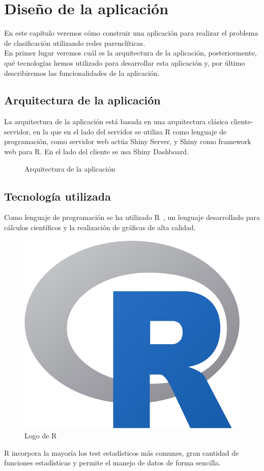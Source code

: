 \chapter{Diseño de la aplicación}

En este capítulo veremos cómo construir una aplicación para realizar el problema de clasificación utilizando redes parenclíticas.\\

En primer lugar veremos cuál es la arquitectura de la aplicación, posteriormente, qué tecnologías hemos utilizado para desarrollar esta aplicación y, por último describiremos las funcionalidades de la aplicación.

\section{Arquitectura de la aplicación}

La arquitectura de la aplicación está basada en una arquitectura clásica cliente-servidor, en la que en el lado del servidor se utiliza R como lenguaje de programación, como servidor web actúa Shiny Server, y Shiny como framework web para R. En el lado del cliente se usa Shiny Dashboard.

\begin{figure}[htbp!]
	\centering
	\arquitectura
	\caption{Arquitectura de la aplicación}
	\label{fig:arquitectura}
\end{figure}

\section{Tecnología utilizada}

Como lenguaje de programación se ha utilizado R~\cite{R}, un lenguaje desarrollado para cálculos científicos y la realización de gráficas de alta calidad.

\begin{figure}[htbp!]
\centering
\includegraphics[width=0.3\linewidth]{imagenes/R}
\caption{Logo de R}
\label{fig:R}
\end{figure}

R incorpora la mayoría los test estadísticos más comunes, gran cantidad de funciones estadísticas y permite el manejo de datos de forma sencilla.\\

